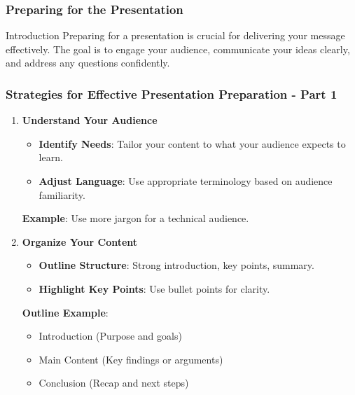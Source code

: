 \documentclass[aspectratio=169]{beamer}
\begin{document}
\begin{frame}[fragile]
    \frametitle{Preparing for the Presentation}
    \begin{block}{Introduction}
        Preparing for a presentation is crucial for delivering your message effectively. The goal is to engage your audience, communicate your ideas clearly, and address any questions confidently.
    \end{block}
\end{frame}

\begin{frame}[fragile]
    \frametitle{Strategies for Effective Presentation Preparation - Part 1}
    \begin{enumerate}
        \item \textbf{Understand Your Audience}
            \begin{itemize}
                \item \textbf{Identify Needs}: Tailor your content to what your audience expects to learn.
                \item \textbf{Adjust Language}: Use appropriate terminology based on audience familiarity.
            \end{itemize}
            \textbf{Example}: Use more jargon for a technical audience.
        
        \item \textbf{Organize Your Content}
            \begin{itemize}
                \item \textbf{Outline Structure}: Strong introduction, key points, summary.
                \item \textbf{Highlight Key Points}: Use bullet points for clarity.
            \end{itemize}
            \textbf{Outline Example}:
            \begin{itemize}
                \item Introduction (Purpose and goals)
                \item Main Content (Key findings or arguments)
                \item Conclusion (Recap and next steps)
            \end{itemize}
    \end{enumerate}
\end{frame}
\end{document}
